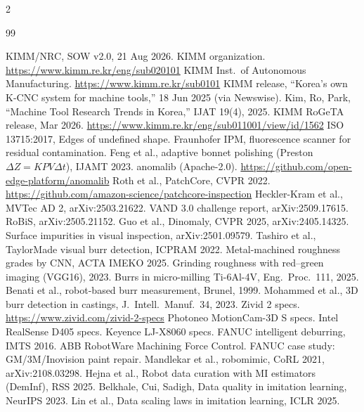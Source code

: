 \documentclass[10pt,a4paper]{article}
\begin{document}
\vspace{2pt}
{\scriptsize
\renewcommand{\refname}{}\vspace{-1.6em}
\begin{multicols}{2}
\begin{thebibliography}{99}\setlength{\itemsep}{-1pt}\raggedright
{} KIMM/NRC, SOW v2.0, 21 Aug 2026.
 KIMM organization. \url{https://www.kimm.re.kr/eng/sub020101}
 KIMM Inst.\ of Autonomous Manufacturing. \url{https://www.kimm.re.kr/sub0101}
 KIMM release, ``Korea's own K-CNC system for machine tools,'' 18 Jun 2025 (via Newswise).
 Kim, Ro, Park, ``Machine Tool Research Trends in Korea,'' IJAT 19(4), 2025.
 KIMM RoGeTA release, Mar 2026. \url{https://www.kimm.re.kr/eng/sub011001/view/id/1562}
 ISO 13715:2017, Edges of undefined shape.
 Fraunhofer IPM, fluorescence scanner for residual contamination.
 Feng et al., adaptive bonnet polishing (Preston $\Delta Z=KPV\Delta t$), IJAMT 2023.
 anomalib (Apache-2.0). \url{https://github.com/open-edge-platform/anomalib}
 Roth et al., PatchCore, CVPR 2022. \url{https://github.com/amazon-science/patchcore-inspection}
 Heckler-Kram et al., MVTec AD 2, arXiv:2503.21622.
 VAND 3.0 challenge report, arXiv:2509.17615.
 RoBiS, arXiv:2505.21152.
 Guo et al., Dinomaly, CVPR 2025, arXiv:2405.14325.
 Surface impurities in visual inspection, arXiv:2501.09579.
 Tashiro et al., TaylorMade visual burr detection, ICPRAM 2022.
 Metal-machined roughness grades by CNN, ACTA IMEKO 2025.
 Grinding roughness with red--green imaging (VGG16), 2023.
 Burrs in micro-milling Ti-6Al-4V, Eng.\ Proc.\ 111, 2025.
 Benati et al., robot-based burr measurement, Brunel, 1999.
 Mohammed et al., 3D burr detection in castings, J.\ Intell.\ Manuf.\ 34, 2023.
 Zivid 2 specs. \url{https://www.zivid.com/zivid-2-specs}
 Photoneo MotionCam-3D S specs.
 Intel RealSense D405 specs.
 Keyence LJ-X8060 specs.
 FANUC intelligent deburring, IMTS 2016.
 ABB RobotWare Machining Force Control.
 FANUC case study: GM/3M/Inovision paint repair.
 Mandlekar et al., robomimic, CoRL 2021, arXiv:2108.03298.
 Hejna et al., Robot data curation with MI estimators (DemInf), RSS 2025.
 Belkhale, Cui, Sadigh, Data quality in imitation learning, NeurIPS 2023.
 Lin et al., Data scaling laws in imitation learning, ICLR 2025.
\end{thebibliography}
\end{multicols}}
\end{document}
